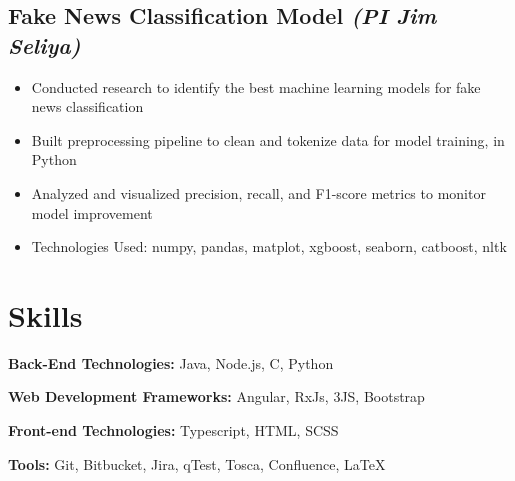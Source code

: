 \documentclass[a4paper,10pt]{article}
\begin{document}
\subsection*{{Fake News Classification Model}  \normalsize \textit{(PI Jim Seliya)}} 
{\fontsize{12}{15}\selectfont
\begin{itemize}[leftmargin=30pt]
    \item Conducted research to identify the best machine learning models for fake news classification
    \item Built preprocessing pipeline to clean and tokenize data for model training, in Python
    \item Analyzed and visualized precision, recall, and F1-score metrics to monitor model improvement
    \item Technologies Used: numpy, pandas, matplot, xgboost, seaborn, catboost, nltk
\end{itemize}
}
\section*{Skills}
\begin{itemize}[leftmargin=20pt, itemsep=0.2em] %
{\fontsize{12}{15}\selectfont
    \item \textbf{Back-End Technologies:} Java, Node.js, C, Python
    \item \textbf{Web Development Frameworks:} Angular, RxJs, 3JS, Bootstrap
    \item \textbf{Front-end Technologies:} Typescript, HTML, SCSS
    \item \textbf{Tools:} Git, Bitbucket, Jira, qTest, Tosca, Confluence, LaTeX
}
\end{itemize}
\end{document}
